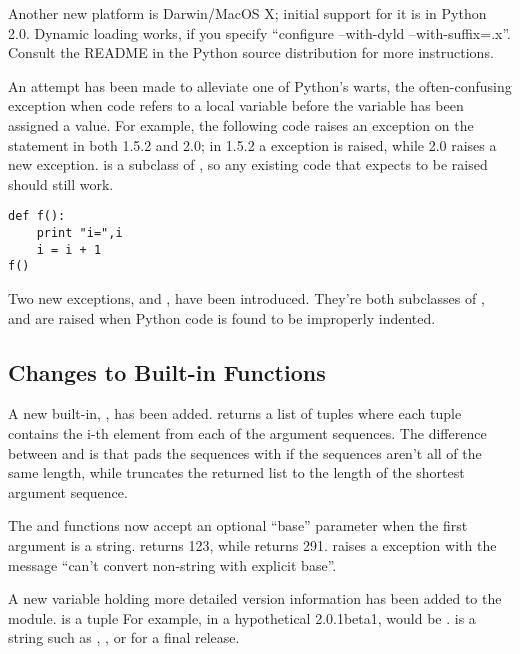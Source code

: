 \documentclass{howto}
\begin{document}
Another new platform is Darwin/MacOS X; initial support for it is in
Python 2.0.  Dynamic loading works, if you specify ``configure
--with-dyld --with-suffix=.x''.  Consult the README in the Python
source distribution for more instructions.

An attempt has been made to alleviate one of Python's warts, the
often-confusing  exception when code refers to a
local variable before the variable has been assigned a value.  For
example, the following code raises an exception on the 
statement in both 1.5.2 and 2.0; in 1.5.2 a 
exception is raised, while 2.0 raises a new
 exception.
 is a subclass of ,
so any existing code that expects  to be raised
should still work.

\begin{verbatim}
def f():
    print "i=",i
    i = i + 1 
f()
\end{verbatim}

Two new exceptions,  and
, have been introduced.  They're both
subclasses of , and are raised when Python code
is found to be improperly indented.

\subsection{Changes to Built-in Functions}

A new built-in, , has been
added.   returns a list of tuples where each tuple
contains the i-th element from each of the argument sequences.  The
difference between  and  is that  pads the sequences with
 if the sequences aren't all of the same length, while
 truncates the returned list to the length of the
shortest argument sequence.

The  and  functions now accept an
optional ``base'' parameter when the first argument is a string.
 returns 123, while  returns
291.   raises a  exception
with the message ``can't convert non-string with explicit base''.

A new variable holding more detailed version information has been
added to the  module.   is a tuple
 For example, in a hypothetical 2.0.1beta1,
 would be .
 is a string such as , , or
 for a final release.
\end{document}
